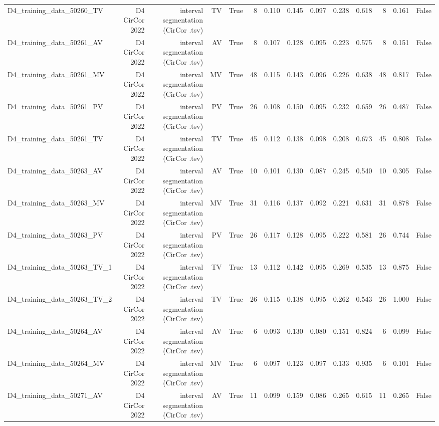 \begin{table}[htbp]
\begin{tabular}{lrrrrrrrrrrrrr}
    D4\_training\_data\_50260\_TV & D4 CirCor 2022 & interval segmentation (CirCor .tsv) & TV & True & 8 & 0.110 & 0.145 & 0.097 & 0.238 & 0.618 & 8 & 0.161 & False \\
    D4\_training\_data\_50261\_AV & D4 CirCor 2022 & interval segmentation (CirCor .tsv) & AV & True & 8 & 0.107 & 0.128 & 0.095 & 0.223 & 0.575 & 8 & 0.151 & False \\
    D4\_training\_data\_50261\_MV & D4 CirCor 2022 & interval segmentation (CirCor .tsv) & MV & True & 48 & 0.115 & 0.143 & 0.096 & 0.226 & 0.638 & 48 & 0.817 & False \\
    D4\_training\_data\_50261\_PV & D4 CirCor 2022 & interval segmentation (CirCor .tsv) & PV & True & 26 & 0.108 & 0.150 & 0.095 & 0.232 & 0.659 & 26 & 0.487 & False \\
    D4\_training\_data\_50261\_TV & D4 CirCor 2022 & interval segmentation (CirCor .tsv) & TV & True & 45 & 0.112 & 0.138 & 0.098 & 0.208 & 0.673 & 45 & 0.808 & False \\
    D4\_training\_data\_50263\_AV & D4 CirCor 2022 & interval segmentation (CirCor .tsv) & AV & True & 10 & 0.101 & 0.130 & 0.087 & 0.245 & 0.540 & 10 & 0.305 & False \\
    D4\_training\_data\_50263\_MV & D4 CirCor 2022 & interval segmentation (CirCor .tsv) & MV & True & 31 & 0.116 & 0.137 & 0.092 & 0.221 & 0.631 & 31 & 0.878 & False \\
    D4\_training\_data\_50263\_PV & D4 CirCor 2022 & interval segmentation (CirCor .tsv) & PV & True & 26 & 0.117 & 0.128 & 0.095 & 0.222 & 0.581 & 26 & 0.744 & False \\
    D4\_training\_data\_50263\_TV\_1 & D4 CirCor 2022 & interval segmentation (CirCor .tsv) & TV & True & 13 & 0.112 & 0.142 & 0.095 & 0.269 & 0.535 & 13 & 0.875 & False \\
    D4\_training\_data\_50263\_TV\_2 & D4 CirCor 2022 & interval segmentation (CirCor .tsv) & TV & True & 26 & 0.115 & 0.138 & 0.095 & 0.262 & 0.543 & 26 & 1.000 & False \\
    D4\_training\_data\_50264\_AV & D4 CirCor 2022 & interval segmentation (CirCor .tsv) & AV & True & 6 & 0.093 & 0.130 & 0.080 & 0.151 & 0.824 & 6 & 0.099 & False \\
    D4\_training\_data\_50264\_MV & D4 CirCor 2022 & interval segmentation (CirCor .tsv) & MV & True & 6 & 0.097 & 0.123 & 0.097 & 0.133 & 0.935 & 6 & 0.101 & False \\
    D4\_training\_data\_50271\_AV & D4 CirCor 2022 & interval segmentation (CirCor .tsv) & AV & True & 11 & 0.099 & 0.159 & 0.086 & 0.265 & 0.615 & 11 & 0.265 & False \\

\end{tabular}
\end{table}
